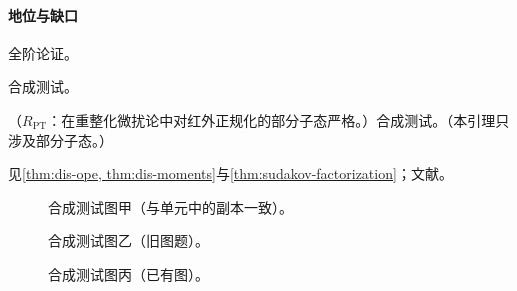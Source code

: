 \paragraph{地位与缺口}全阶论证。

\begin{example}[节标签依赖]\label{ex:dis-seclabel}
合成测试。
\end{example}

\begin{lemma}\label{lem:dis-hidden}
（$R_{\mathrm{PT}}$：在重整化微扰论中对红外正规化的部分子态严格。）合成测试。（本引理只涉及部分子态。）
\end{lemma}

见\cref{thm:dis-ope, thm:dis-moments}与\cref{thm:sudakov-factorization}；文献\cite{Synth:2026abc,NoSuchKey2099}。

\begin{figure}[htbp]
\centering
{}
\caption{合成测试图甲（与单元中的副本一致）。}\label{fig:synth-same}
\end{figure}

\begin{figure}[htbp]
\centering
{}
\caption{合成测试图乙（旧图题）。}\label{fig:synth-changed}
\end{figure}

\begin{figure}[htbp]
\centering
{}
\caption{合成测试图丙（已有图）。}\label{fig:synth-existing}
\end{figure}
